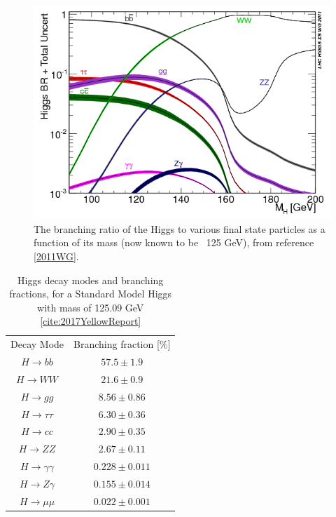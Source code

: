 \begin{figure}
\includegraphics[width=\linewidth]{figures/theory_chapter/HiggsBR.png}
\caption{The branching ratio of the Higgs to various final state particles as a function of its mass (now known to be ~125 GeV), from reference \ref{2011WG}.}
\end{figure}

\begin{table}[h]
    \centering
    \begin{tabular}{cc}
        	Decay Mode & Branching fraction [\%] \\
            $H \rightarrow bb $ & $ 57.5 \pm 1.9 $ \\
			$H \rightarrow WW $ & $ 21.6 \pm 0.9 $ \\
			$H \rightarrow gg $ & $ 8.56 \pm 0.86 $ \\
			$H \rightarrow \tau \tau $ & $ 6.30 \pm 0.36 $ \\
			$H \rightarrow cc $ & $ 2.90 \pm 0.35 $ \\
			$H \rightarrow ZZ $ & $ 2.67 \pm 0.11 $ \\
			$H \rightarrow \gamma \gamma $ & $ 0.228 \pm 0.011 $ \\
			$H \rightarrow Z \gamma $ & $ 0.155 \pm 0.014 $ \\
			$H \rightarrow \mu \mu $ & $ 0.022 \pm 0.001 $ \\
    \end{tabular}
    \caption{Higgs decay modes and branching fractions, for a Standard Model Higgs with mass of 125.09 GeV \ref{cite:2017YellowReport}}
    \label{mytable}
\end{table}

